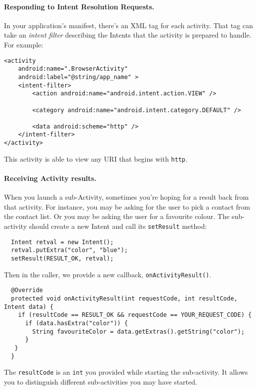 \paragraph{Responding to Intent Resolution Requests.}
In your application's manifest, there's an XML tag for each activity.
That tag can take an \emph{intent filter} describing the Intents
that the activity is prepared to handle. For example:
{ 
\begin{verbatim}
<activity
    android:name=".BrowserActivity"
    android:label="@string/app_name" >
    <intent-filter>
        <action android:name="android.intent.action.VIEW" />

        <category android:name="android.intent.category.DEFAULT" />

        <data android:scheme="http" />
    </intent-filter>
</activity>
\end{verbatim}
}
This activity is able to view any URI that begins with {\tt http}.

\paragraph{Receiving Activity results.}
When you launch a sub-Activity, sometimes you're hoping for a result
back from that activity. For instance, you may be asking for the
user to pick a contact from the contact list. Or you may be asking the
user for a favourite colour. The sub-activity should
create a new Intent and call its {\tt setResult} method:

{ 
\begin{verbatim}
  Intent retval = new Intent();
  retval.putExtra("color", "blue");
  setResult(RESULT_OK, retval);
\end{verbatim}
}

Then in the caller, we provide a new callback, {\tt onActivityResult()}.

{
\begin{verbatim}
  @Override
  protected void onActivityResult(int requestCode, int resultCode, Intent data) {
    if (resultCode == RESULT_OK && requestCode == YOUR_REQUEST_CODE) {
      if (data.hasExtra("color")) {
        String favouriteColor = data.getExtras().getString("color");
      }
   }
  }
\end{verbatim}
}

The {\tt resultCode} is an {\tt int} you provided while starting the
sub-activity. It allows you to distinguish different sub-activities you
may have started.



